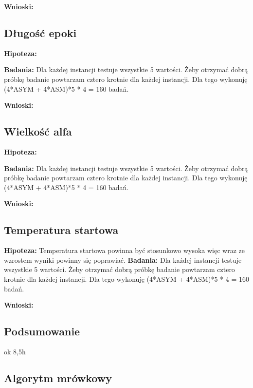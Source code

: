 \documentclass{article}
\begin{document}
        \textbf{Wnioski: } 
      \subsection{Długość epoki}

        \textbf{Hipoteza: }

        \textbf{Badania: } Dla każdej instancji testuje wszystkie 5 wartości. 
        Żeby otrzymać dobrą próbkę badanie powtarzam cztero krotnie dla każdej 
        instancji. Dla tego wykonuję (4*ASYM + 4*ASM)*5 * 4 = 160 badań.\linebreak 

        \textbf{Wnioski: } 
      \subsection{Wielkość alfa}

        \textbf{Hipoteza: }

        \textbf{Badania: } Dla każdej instancji testuje wszystkie 5 wartości. 
        Żeby otrzymać dobrą próbkę badanie powtarzam cztero krotnie dla każdej 
        instancji. Dla tego wykonuję (4*ASYM + 4*ASM)*5 * 4 = 160 badań.\linebreak

        \textbf{Wnioski: } 
      \subsection{Temperatura startowa}

        \textbf{Hipoteza: } Temperatura startowa powinna być stosunkowo wysoka
        więc wraz ze wzrostem wyniki powinny się poprawiać.\linebreak
        \textbf{Badania: } Dla każdej instancji testuje wszystkie 5 wartości. 
        Żeby otrzymać dobrą próbkę badanie powtarzam cztero krotnie dla każdej 
        instancji. Dla tego wykonuję (4*ASYM + 4*ASM)*5 * 4 = 160 badań.\linebreak
        
        \textbf{Wnioski: } 
      \subsection{Podsumowanie}ok 8,5h

    \subsection{Algorytm mrówkowy}
\end{document}
